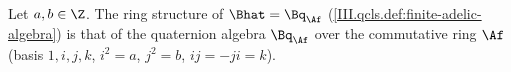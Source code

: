 Let $a,b\in\Z$. The ring structure of $\Bhat=\Bq_{\Af}$ (\cref{III.qcls.def:finite-adelic-algebra}) is that of the quaternion algebra $\Bq_{\Af}$ over the commutative ring $\Af$
(basis $1,i,j,k$, $i^2=a$, $j^2=b$, $ij=-ji=k$).
